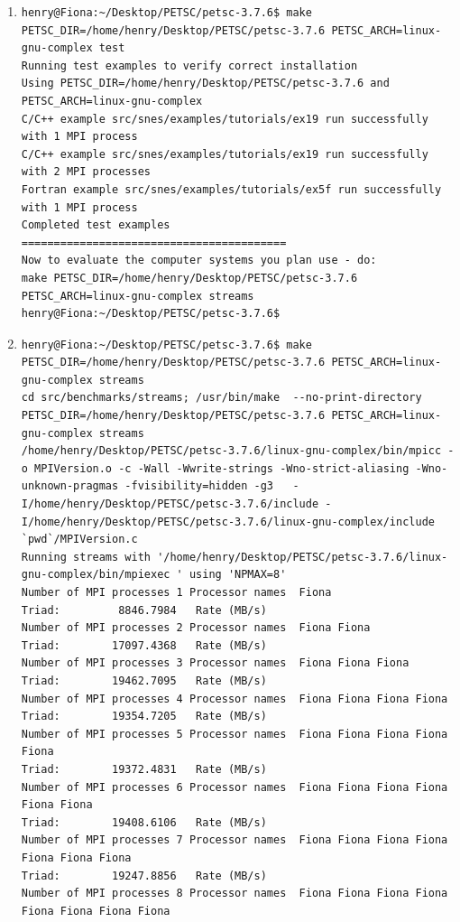 \documentclass{article}
\begin{document}
\begin{enumerate}
\normalsize
\item  
\tiny
\begin{verbatim}
henry@Fiona:~/Desktop/PETSC/petsc-3.7.6$ make PETSC_DIR=/home/henry/Desktop/PETSC/petsc-3.7.6 PETSC_ARCH=linux-gnu-complex test
Running test examples to verify correct installation
Using PETSC_DIR=/home/henry/Desktop/PETSC/petsc-3.7.6 and PETSC_ARCH=linux-gnu-complex
C/C++ example src/snes/examples/tutorials/ex19 run successfully with 1 MPI process
C/C++ example src/snes/examples/tutorials/ex19 run successfully with 2 MPI processes
Fortran example src/snes/examples/tutorials/ex5f run successfully with 1 MPI process
Completed test examples
=========================================
Now to evaluate the computer systems you plan use - do:
make PETSC_DIR=/home/henry/Desktop/PETSC/petsc-3.7.6 PETSC_ARCH=linux-gnu-complex streams
henry@Fiona:~/Desktop/PETSC/petsc-3.7.6$  
\end{verbatim}
\normalsize
\item
\tiny
\begin{verbatim}
henry@Fiona:~/Desktop/PETSC/petsc-3.7.6$ make PETSC_DIR=/home/henry/Desktop/PETSC/petsc-3.7.6 PETSC_ARCH=linux-gnu-complex streams
cd src/benchmarks/streams; /usr/bin/make  --no-print-directory PETSC_DIR=/home/henry/Desktop/PETSC/petsc-3.7.6 PETSC_ARCH=linux-gnu-complex streams
/home/henry/Desktop/PETSC/petsc-3.7.6/linux-gnu-complex/bin/mpicc -o MPIVersion.o -c -Wall -Wwrite-strings -Wno-strict-aliasing -Wno-unknown-pragmas -fvisibility=hidden -g3   -I/home/henry/Desktop/PETSC/petsc-3.7.6/include -I/home/henry/Desktop/PETSC/petsc-3.7.6/linux-gnu-complex/include    `pwd`/MPIVersion.c
Running streams with '/home/henry/Desktop/PETSC/petsc-3.7.6/linux-gnu-complex/bin/mpiexec ' using 'NPMAX=8' 
Number of MPI processes 1 Processor names  Fiona 
Triad:         8846.7984   Rate (MB/s) 
Number of MPI processes 2 Processor names  Fiona Fiona 
Triad:        17097.4368   Rate (MB/s) 
Number of MPI processes 3 Processor names  Fiona Fiona Fiona 
Triad:        19462.7095   Rate (MB/s) 
Number of MPI processes 4 Processor names  Fiona Fiona Fiona Fiona 
Triad:        19354.7205   Rate (MB/s) 
Number of MPI processes 5 Processor names  Fiona Fiona Fiona Fiona Fiona 
Triad:        19372.4831   Rate (MB/s) 
Number of MPI processes 6 Processor names  Fiona Fiona Fiona Fiona Fiona Fiona 
Triad:        19408.6106   Rate (MB/s) 
Number of MPI processes 7 Processor names  Fiona Fiona Fiona Fiona Fiona Fiona Fiona 
Triad:        19247.8856   Rate (MB/s) 
Number of MPI processes 8 Processor names  Fiona Fiona Fiona Fiona Fiona Fiona Fiona Fiona 

\end{verbatim}
\end{enumerate}
\end{document}
